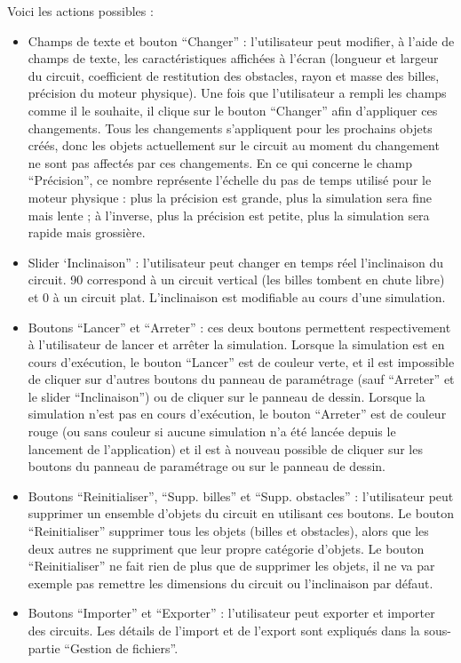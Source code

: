 \documentclass{report}
\begin{document}
Voici les actions possibles :
\begin{itemize}
\item Champs de texte et bouton “Changer” : l’utilisateur peut modifier, à l’aide de champs de texte, les caractéristiques affichées à l’écran (longueur et largeur du circuit, coefficient de restitution des obstacles, rayon et masse des billes, précision du moteur physique). Une fois que l’utilisateur a rempli les champs comme il le souhaite, il clique sur le bouton “Changer” afin d’appliquer ces changements. Tous les changements s’appliquent pour les prochains objets créés, donc les objets actuellement sur le circuit au moment du changement ne sont pas affectés par ces changements. En ce qui concerne le champ “Précision”, ce nombre représente l’échelle du pas de temps utilisé pour le moteur physique : plus la précision est grande, plus la simulation sera fine mais lente ; à l’inverse, plus la précision est petite, plus la simulation sera rapide mais grossière.
\item Slider ‘Inclinaison” : l’utilisateur peut changer en temps réel l’inclinaison du circuit. 90 correspond à un circuit vertical (les billes tombent en chute libre) et 0 à un circuit plat. L’inclinaison est modifiable au cours d’une simulation.
\item Boutons “Lancer” et “Arreter” : ces deux boutons permettent respectivement à l’utilisateur de lancer et arrêter la simulation. Lorsque la simulation est en cours d’exécution, le bouton “Lancer” est de couleur verte, et il est impossible de cliquer sur d’autres boutons du panneau de paramétrage (sauf “Arreter” et le slider “Inclinaison”) ou de cliquer sur le panneau de dessin. Lorsque la simulation n’est pas en cours d’exécution, le bouton “Arreter” est de couleur rouge (ou sans couleur si aucune simulation n’a été lancée depuis le lancement de l’application) et il est à nouveau possible de cliquer sur les boutons du panneau de paramétrage ou sur le panneau de dessin.
\item Boutons “Reinitialiser”, “Supp. billes” et “Supp. obstacles” : l’utilisateur peut supprimer un ensemble d’objets du circuit en utilisant ces boutons. Le bouton “Reinitialiser” supprimer tous les objets (billes et obstacles), alors que les deux autres ne suppriment que leur propre catégorie d’objets. Le bouton “Reinitialiser” ne fait rien de plus que de supprimer les objets, il ne va par exemple pas remettre les dimensions du circuit ou l’inclinaison par défaut.
\item Boutons “Importer” et “Exporter” : l’utilisateur peut exporter et importer des circuits. Les détails de l’import et de l’export sont expliqués dans la sous-partie “Gestion de fichiers”.
\end{itemize}
\end{document}
